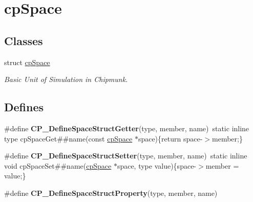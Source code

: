 \hypertarget{group__cp_space}{\section{cp\-Space}
\label{group__cp_space}
}
\subsection*{Classes}
\begin{DoxyCompactItemize}
\item 
struct \hyperlink{structcp_space}{cp\-Space}
\begin{DoxyCompactList}\small\item\em Basic Unit of Simulation in Chipmunk. \end{DoxyCompactList}\end{DoxyCompactItemize}
\subsection*{Defines}
\begin{DoxyCompactItemize}
\item 
\hypertarget{group__cp_space_ga4baa3370fb35f0ee69c554bc014f02b7}{\#define {\bfseries C\-P\-\_\-\-Define\-Space\-Struct\-Getter}(type, member, name)~static inline type cp\-Space\-Get\#\#name(const \hyperlink{structcp_space}{cp\-Space} $\ast$space)\{return space-\/$>$member;\}}\label{group__cp_space_ga4baa3370fb35f0ee69c554bc014f02b7}

\item 
\hypertarget{group__cp_space_ga044bac924cf9eb5142ec6df23d1031fb}{\#define {\bfseries C\-P\-\_\-\-Define\-Space\-Struct\-Setter}(type, member, name)~static inline void cp\-Space\-Set\#\#name(\hyperlink{structcp_space}{cp\-Space} $\ast$space, type value)\{space-\/$>$member = value;\}}\label{group__cp_space_ga044bac924cf9eb5142ec6df23d1031fb}

\item 
\#define {\bfseries C\-P\-\_\-\-Define\-Space\-Struct\-Property}(type, member, name)
\end{DoxyCompactItemize}
